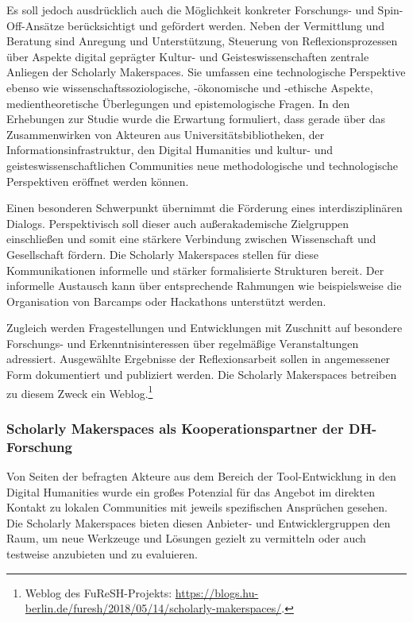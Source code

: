 \documentclass[a4paper,
fontsize=11pt,
oneside,
numbers=noperiodatend,
parskip=half-,
bibliography=totoc,
final
]{scrartcl}
\begin{document}
Es soll jedoch ausdrücklich auch die Möglichkeit konkreter Forschungs-
und Spin-Off-Ansätze berücksichtigt und gefördert werden. Neben der
Vermittlung und Beratung sind Anregung und Unterstützung, Steuerung von
Reflexionsprozessen über Aspekte digital geprägter Kultur- und
Geisteswissenschaften zentrale Anliegen der Scholarly Makerspaces. Sie
umfassen eine technologische Perspektive ebenso wie
wissenschaftssoziologische, -ökonomische und -ethische Aspekte,
medientheoretische Überlegungen und epistemologische Fragen. In den
Erhebungen zur Studie wurde die Erwartung formuliert, dass gerade über
das Zusammenwirken von Akteuren aus Universitätsbibliotheken, der
Informationsinfrastruktur, den Digital Humanities und kultur- und
geisteswissenschaftlichen Communities neue methodologische und
technologische Perspektiven eröffnet werden können.

Einen besonderen Schwerpunkt übernimmt die Förderung eines
interdisziplinären Dialogs. Perspektivisch soll dieser auch
außerakademische Zielgruppen einschließen und somit eine stärkere
Verbindung zwischen Wissenschaft und Gesellschaft fördern. Die Scholarly
Makerspaces stellen für diese Kommunikationen informelle und stärker
formalisierte Strukturen bereit. Der informelle Austausch kann über
entsprechende Rahmungen wie beispielsweise die Organisation von Barcamps
oder Hackathons unterstützt werden.

Zugleich werden Fragestellungen und Entwicklungen mit Zuschnitt auf
besondere Forschungs- und Erkenntnisinteressen über regelmäßige
Veranstaltungen adressiert. Ausgewählte Ergebnisse der Reflexionsarbeit
sollen in angemessener Form dokumentiert und publiziert werden. Die
Scholarly Makerspaces betreiben zu diesem Zweck ein Weblog.\footnote{Weblog
  des FuReSH-Projekts:
  \url{https://blogs.hu-berlin.de/furesh/2018/05/14/scholarly-makerspaces/}.}

\hypertarget{scholarly-makerspaces-als-kooperationspartner-der-dh-forschung}{%
\subsubsection{Scholarly Makerspaces als Kooperationspartner der
DH-Forschung}\label{scholarly-makerspaces-als-kooperationspartner-der-dh-forschung}}

Von Seiten der befragten Akteure aus dem Bereich der Tool-Entwicklung in
den Digital Humanities wurde ein großes Potenzial für das Angebot im
direkten Kontakt zu lokalen Communities mit jeweils spezifischen
Ansprüchen gesehen. Die Scholarly Makerspaces bieten diesen Anbieter-
und Entwicklergruppen den Raum, um neue Werkzeuge und Lösungen gezielt
zu vermitteln oder auch testweise anzubieten und zu evaluieren.
\end{document}
